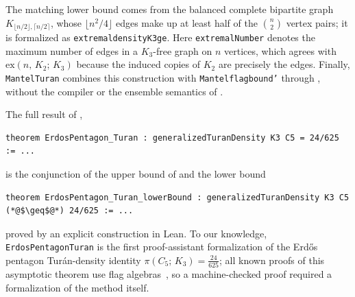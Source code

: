 \documentclass[acmsmall,screen=true,acmthm=false]{acmart}
\newcommand{\tdensity}[2]{\pi(#1;\,#2)}
\newcommand{\boldparagraph}[1]{\noindentparagraph{\textnormal{\textbf{#1}}}}
\DeclareRobustCommand{\lean}[1]{{\def\_{\textunderscore\allowbreak}\texttt{#1}}}
\begin{document}
The matching lower bound comes from the balanced complete bipartite graph
$K_{\lfloor n/2\rfloor,\lceil n/2\rceil}$, whose
$\lfloor n^2/4\rfloor$ edges make up at least half of the $\binom{n}{2}$
vertex pairs; it is formalized as \lean{extremal\_density\_K3\_ge}.  Here
\lean{extremalNumber} denotes the maximum
number of edges in a $K_3$-free graph on $n$ vertices, which agrees with
$\mathrm{ex}(n,\,K_2;\,K_3)$ because the induced copies of $K_2$ are precisely
the edges.  Finally, \lean{Mantel\_Turan} combines this construction with
\lean{Mantel\_flag\_bound'} through , without the
compiler or the ensemble semantics of .

\boldparagraph{The Erd\H{o}s pentagon theorem.}
The full result of ,
\begin{lstlisting}
theorem ErdosPentagon_Turan : generalizedTuranDensity K3 C5 = 24/625 := ...
\end{lstlisting}
is the conjunction of the upper bound of  and the lower
bound
\begin{lstlisting}
theorem ErdosPentagon_Turan_lowerBound : generalizedTuranDensity K3 C5 (*@$\geq$@*) 24/625 := ...
\end{lstlisting}
proved by an explicit construction in Lean.  To our knowledge,
\lean{ErdosPentagon\_Turan} is the first proof-assistant formalization of the
Erd\H{o}s pentagon Tur\'an-density identity
$\tdensity{C_5}{K_3}=\tfrac{24}{625}$; all known proofs of this asymptotic
theorem use flag algebras~\cite{grzesik2012,hatami2012}, so a machine-checked
proof required a formalization of the method itself.
\end{document}
